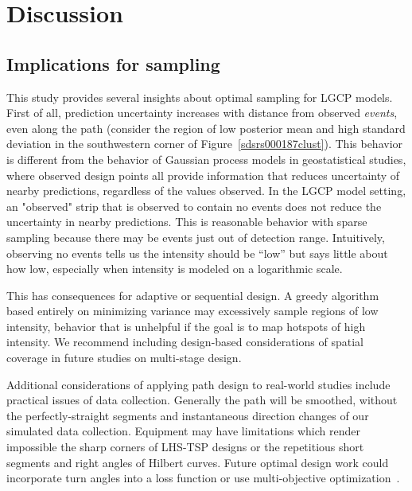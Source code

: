\documentclass[review]{elsarticle}
\begin{document}


\section{Discussion}

\subsection{Implications for sampling}

This study provides several insights about optimal sampling for LGCP models.
First of all, prediction uncertainty increases with distance from observed
\emph{events}, even along the path (consider the region of low posterior mean
and high standard deviation in the southwestern corner of
Figure~\ref{sdsrs000187clust}). This behavior is different from the behavior
of Gaussian process models in geostatistical studies, where observed design
points all provide information that reduces uncertainty of nearby predictions,
regardless of the values observed. In the LGCP model setting, an "observed"
strip that is observed to contain no events does not reduce the uncertainty in
nearby predictions. This is reasonable behavior with sparse sampling because
there may be events just out of detection range. Intuitively, observing no
events tells us the intensity should be ``low'' but says little about how low,
especially when intensity is modeled on a logarithmic scale.

This has consequences for adaptive or sequential design. A greedy algorithm
based entirely on minimizing variance may excessively sample regions of low
intensity, behavior that is unhelpful if the goal is to map hotspots of high
intensity. We recommend including design-based considerations of spatial
coverage in future studies on multi-stage design.

Additional considerations of applying path design to real-world studies include
practical issues of data collection. Generally the path will be smoothed,
without the perfectly-straight segments and instantaneous direction changes of
our simulated data collection. Equipment may have limitations which render
impossible the sharp corners of LHS-TSP designs or the repetitious short
segments and right angles of Hilbert curves. Future optimal design work could
incorporate turn angles into a loss function or use multi-objective
optimization~\citep{lark}.
\end{document}
